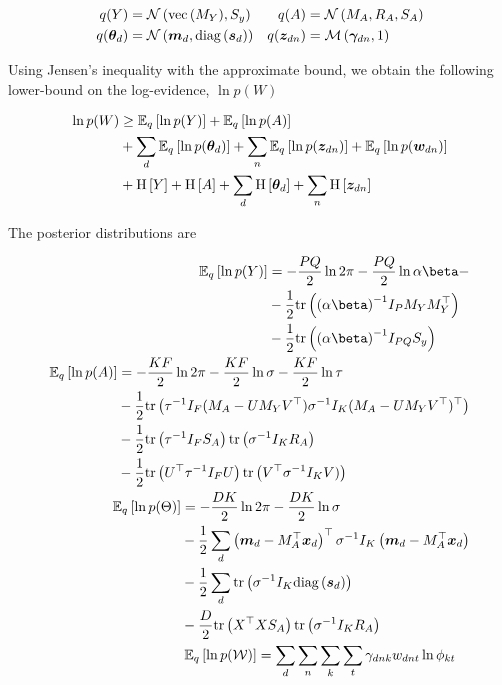 \begin{equation}
\begin{split}
q(Y) &= \nor{\vecf{M_Y}}{S_y} &
q(A) &= \mnor{M_A}{R_A}{S_A} \\
q(\thd) &= \nor{\md}{\diag{\vv{s}_d}} &
q(\zdn) & = \muln{\gdn}{1} \\
\end{split}
\end{equation}


Using Jensen's inequality with the approximate bound, we obtain the following lower-bound on the log-evidence, $\ln p(W)$

\begin{equation}
\begin{split}
\ln p(W) 
&\geq \ex{\ln p(Y)}{q} + \ex{\ln p(A)}{q} \\
&+ \sum_d \ex{\ln p(\thd)}{q} + \sum_n \ex{\ln p(\zdn)}{q} + \ex{\ln p(\wdn)}{q} \\
&+ \ent{Y} + \ent{A} + \sum_d \ent {\thd} + \sum_n \ent{\zdn}
\end{split}
\end{equation}

The posterior distributions are

\begin{align}
\begin{split}
\ex{\ln p(Y)}{q} 
    & = -\halve{PQ} \ln 2\pi - \halve{PQ} \ln \alpha \beta - \\
    & - \half \Tr{ \invb{\alpha \beta} I_P M_Y M_Y\T } \\
    & - \half \Tr{\invb{\alpha \beta} I_{PQ} S_y }
\end{split} \\
\begin{split}
\ex{\ln p(A)}{q} 
    & = -\halve{KF} \ln 2\pi - \halve{KF} \ln \sigma - \halve{KF} \ln \tau \\
    & - \half \Tr{ \inv{\tau} I_F (M_A - U M_Y V\T) \inv{\sigma} I_K (M_A - U M_Y V\T)\T } \\
    & - \half \Tr{ \inv{\tau} I_F S_A}\Tr{\inv{\sigma} I_K R_A} \\
    & - \half \Tr{ U\T \inv{\tau}I_F U}\Tr{ V\T \inv{\sigma} I_K V)}
\end{split} \\
\begin{split}
\ex{\ln p(\Theta)}{q} 
    & = -\halve{DK} \ln 2\pi - \halve{DK} \ln \sigma  \\
    & - \half \sum_d \left(\md - M_A\T \xd\right)\T \inv{\sigma} I_K \left(\md - M_A\T \xd\right) \\
    & - \half \sum_d \Tr{ \inv{\sigma} I_K \diag{\vv{s}_d}} \\
    & - \halve{D} \Tr{ X\T X S_A}\Tr{\inv{\sigma} I_K R_A}
\end{split}\\
\begin{split}
\ex{\ln p(\mathcal{W})}{q} 
    & = \sum_d \sum_n \sum_k \sum_t \gdnk \wdnt \ln \phi_{kt}
\end{split}
\end{align}

